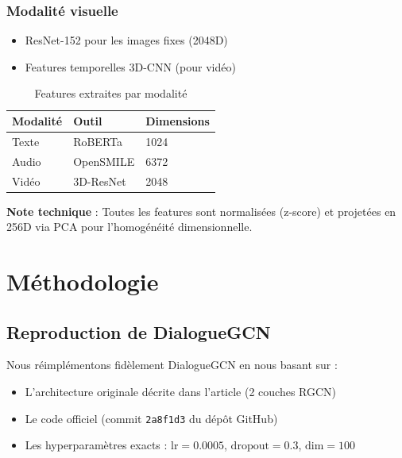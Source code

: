 \documentclass[a4paper,11pt]{article}
\begin{document}
\subsubsection{Modalité visuelle}
\begin{itemize}
    \item ResNet-152 pour les images fixes (2048D)
    \item Features temporelles 3D-CNN (pour vidéo)
\end{itemize}

\begin{table}[h]
\centering
\begin{tabular}{lll}
\toprule
Modalité & Outil & Dimensions \\
\midrule
Texte & RoBERTa & 1024 \\
Audio & OpenSMILE & 6372 \\
Vidéo & 3D-ResNet & 2048 \\
\bottomrule
\end{tabular}
\caption{Features extraites par modalité}
\label{tab:features}
\end{table}

\textbf{Note technique} : Toutes les features sont normalisées (z-score) et projetées en 256D via PCA pour l'homogénéité dimensionnelle.





















\section{Méthodologie}
\subsection{Reproduction de DialogueGCN}
Nous réimplémentons fidèlement DialogueGCN \cite{ghosal2019dialoguegcn} en nous basant sur :

\begin{itemize}
    \item L'architecture originale décrite dans l'article (2 couches RGCN)
    \item Le code officiel (commit \texttt{2a8f1d3} du dépôt GitHub)
    \item Les hyperparamètres exacts : $\text{lr}=0.0005$, $\text{dropout}=0.3$, $\text{dim}=100$
\end{itemize}
\end{document}
